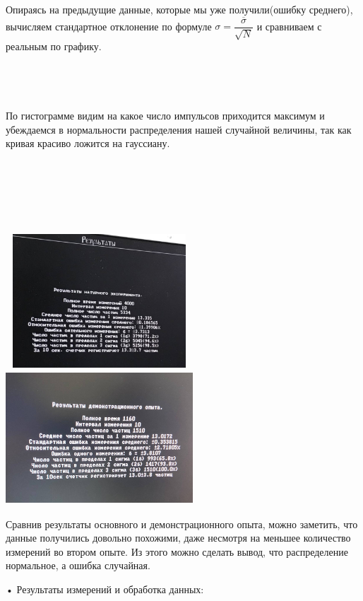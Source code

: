 \documentclass[a4paper,14pt]{extarticle}
\begin{document}
	Опираясь на предыдущие данные, которые мы уже получили(ошибку среднего), вычисляем стандартное отклонение по формуле $\sigma = \dfrac{\overline{\sigma}}{\sqrt{N}}$ и сравниваем с реальным по графику.
	\newline
	\bigskip
	\\
	\\
	\\
	\\
	\\
	По гистограмме видим на какое число импульсов приходится максимум и убеждаемся в нормальности распределения нашей случайной величины, так как кривая красиво ложится на гауссиану.
	\newline
	\bigskip
	\\
	\\
	\\
	\\
	\\
	\\
	\\
	\newpage
	\includegraphics[width= 7cm, height= 5cm]{5.jpg}
	\includegraphics[width= 7cm, height= 5cm]{7.jpg}
	
	
	Сравнив результаты основного и демонстрационного опыта, можно заметить, что данные получились довольно похожими, даже несмотря на меньшее количество измерений во втором опыте. Из этого можно сделать вывод, что распределение нормальное, а ошибка случайная.
	


	• Результаты измерений и обработка данных:
	
\end{document}
